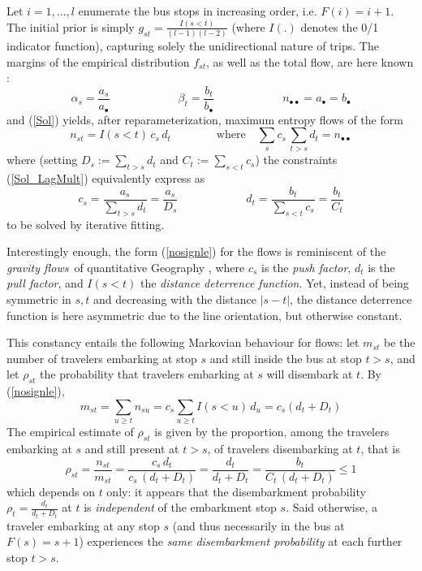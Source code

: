 \documentclass{bmcart}
\begin{document}
Let  $i=1,\ldots, l$ enumerate the bus stops in increasing order,  i.e. $F(i)=i+1$. The initial prior is simply $g_{st}=\frac{I(s<t)}{(l-1)(l-2)}$ (where $I(.)$ denotes the 0/1  indicator function), capturing solely the unidirectional nature of trips. The margins of the empirical distribution $f_{st}$, as well as the total flow, are here known : 
\begin{displaymath}
\alpha_s=\frac{a_s}{a_\bullet}\qquad\qquad\qquad \beta_t=\frac{b_t}{b_\bullet}\qquad\qquad\qquad n_{\bullet\bullet}=a_{\bullet}=b_\bullet
\end{displaymath}
and (\ref{Sol}) yields, after reparameterization, maximum entropy flows of the form
\begin{equation}
\label{nosignle}
n_{st}=I(s<t)\, c_s\, d_t \qquad\qquad\mbox{where}\quad \sum_{s}c_s\, \sum_{t>s}d_t=n_{\bullet\bullet}
\end{equation}
where (setting $D_s:=\sum_{t>s}d_t$ and $C_t:=\sum_{s<t}c_s$) the constraints (\ref{Sol_LagMult}) equivalently express as 
\begin{equation}
\label{dis embarking constraints}
c_s=\frac{a_s}{\sum_{t>s}d_t}=\frac{a_s}{D_s}
\qquad\qquad\qquad
d_t=\frac{b_t}{\sum_{s<t}c_s}=\frac{b_t}{C_t}
\end{equation}
to be solved by iterative fitting. 

Interestingly enough, the form (\ref{nosignle}) for the flows is reminiscent of the {\em gravity flows} of quantitative Geography \cite{wilson1967statistical}  \cite{erlander1990gravity} \cite{bavaud2002quasi}, where 
$c_s$ is the {\em push factor}, $d_t$ is the {\em pull factor}, and $I(s<t)$ the {\em distance deterrence function}. Yet, instead of  
being symmetric in $s,t$ and decreasing with the distance $|s-t|$, the distance deterrence function is here asymmetric due to the line orientation, but otherwise constant. 

This constancy entails the following Markovian behaviour for flows: let $m_{st}$ be the number of travelers embarking at stop $s$ and still inside the bus at stop $t>s$, and let $\rho_{st}$ the probability that travelers embarking at $s$ will disembark at $t$. By (\ref{nosignle}), 
\begin{displaymath}
m_{st}=\sum_{u\ge t}n_{su}=c_s \sum_{u\ge t} I(s<u)\, d_u =c_s (d_t+D_t) 
\end{displaymath}
The empirical estimate of $\rho_{st}$ is given by the proportion, among the travelers embarking at $s$ and 
 still present at $t>s$,  of travelers disembarking at $t$, that is 
\begin{displaymath}
\rho_{st}=\frac{n_{st}}{m_{st}}=\frac{c_s\,  d_t}{c_s\,  (d_t+D_t)}=\frac{d_t}{d_t+D_t}=\frac{b_t}{C_t\, (d_t+D_t)}\le 1
\end{displaymath}
which depends on $t$ only: it appears that the disembarkment probability $\rho_t=\frac{d_t}{d_t+D_t}$ at $t$ is {\em independent} of the embarkment stop $s$. Said otherwise, a traveler embarking at any stop $s$ (and thus necessarily in the bus at $F(s)=s+1$) experiences the {\em same disembarkment probability} at each further stop $t>s$. 
\end{document}
